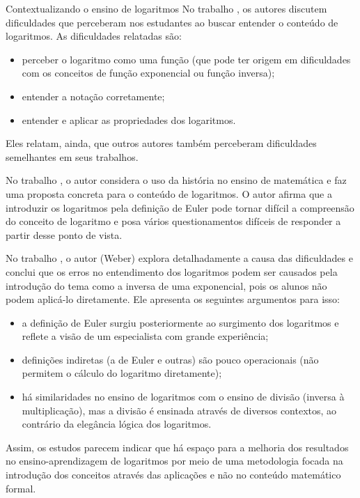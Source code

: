 \begin{apresentacao}{Contextualizando o ensino de logaritmos}
No trabalho \citep{Kenney2013}, os autores discutem dificuldades que perceberam nos estudantes ao buscar entender o conteúdo de logaritmos. As dificuldades relatadas são:
	\begin{itemize}
	\item perceber o logaritmo como uma função (que pode ter origem em dificuldades com os conceitos de função exponencial ou função inversa);
	\item entender a notação corretamente; 
	\item entender e aplicar as propriedades dos logaritmos.
	\end{itemize}
Eles relatam, ainda, que outros autores também perceberam dificuldades semelhantes em seus trabalhos.

No trabalho \citep{Panagiotou2011}, o autor considera o uso da história no ensino de matemática e faz uma proposta concreta para o conteúdo de logaritmos. O autor afirma que a introduzir os logaritmos pela definição de Euler pode tornar difícil a compreensão do conceito de logaritmo e posa vários questionamentos difíceis de responder a partir desse ponto de vista.

No trabalho \citep{Weber2016}, o autor (Weber) explora detalhadamente a causa das dificuldades e conclui que os erros no entendimento dos logaritmos podem ser causados pela introdução do tema como a inversa de uma exponencial, pois os alunos não podem aplicá-lo diretamente. Ele apresenta os seguintes argumentos para isso:
\begin{itemize}
\item a definição de Euler surgiu posteriormente ao surgimento dos logaritmos e reflete a visão de um especialista com grande experiência;
\item definições indiretas (a de Euler e outras) são pouco operacionais (não permitem o cálculo do logaritmo diretamente);
\item há similaridades no ensino de logaritmos com o ensino de divisão (inversa à multiplicação), mas a divisão é ensinada através de diversos contextos, ao contrário da elegância lógica dos logaritmos.
\end{itemize}
	
Assim, os estudos parecem indicar que há espaço para a melhoria dos resultados no ensino-aprendizagem de logaritmos por meio de uma metodologia focada na introdução dos conceitos através das aplicações e não no conteúdo matemático formal.


\end{apresentacao}
